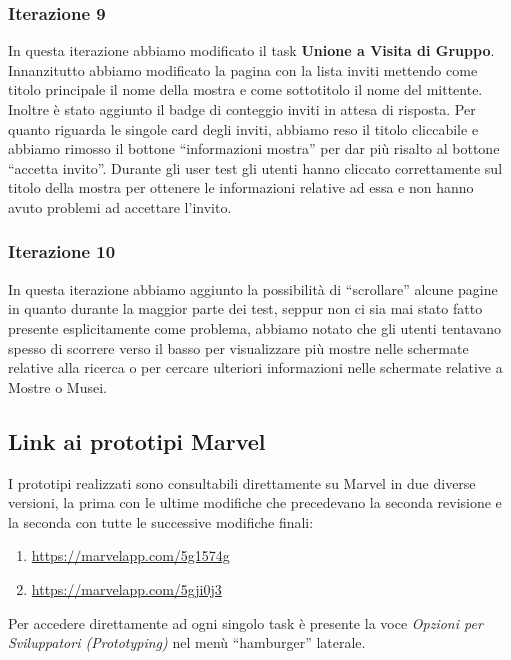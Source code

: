 \subsubsection{Iterazione 9}
In questa iterazione abbiamo modificato il task \textbf{Unione a Visita di Gruppo}. Innanzitutto abbiamo modificato la pagina con la lista inviti mettendo come titolo principale il nome della mostra e come sottotitolo il nome del mittente. Inoltre è stato aggiunto il badge di conteggio inviti in attesa di risposta. Per quanto riguarda le singole card degli inviti, abbiamo reso il titolo cliccabile e abbiamo rimosso il bottone ``informazioni mostra'' per dar più risalto al bottone ``accetta invito''. Durante gli user test gli utenti hanno cliccato correttamente sul titolo della mostra per ottenere le informazioni relative ad essa e non hanno avuto problemi ad accettare l'invito.

\subsubsection{Iterazione 10}
In questa iterazione abbiamo aggiunto la possibilità di ``scrollare'' alcune pagine in quanto durante la maggior parte dei test, seppur non ci sia mai stato fatto presente esplicitamente come problema, abbiamo notato che gli utenti tentavano spesso di scorrere verso il basso per visualizzare più mostre nelle schermate relative alla ricerca o per cercare ulteriori informazioni nelle schermate relative a Mostre o Musei.

\subsection{Link ai prototipi Marvel}
I prototipi realizzati sono consultabili direttamente su Marvel in due diverse versioni, la prima con le ultime modifiche che precedevano la seconda revisione e la seconda con tutte le successive modifiche finali:
\begin{enumerate}
    \item \url{https://marvelapp.com/5g1574g}
    \item \url{https://marvelapp.com/5gji0j3}
\end{enumerate}

Per accedere direttamente ad ogni singolo task è presente la voce \textit{Opzioni per Sviluppatori (Prototyping)} nel menù ``hamburger'' laterale.
